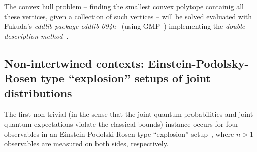 The convex hull problem --  finding the smallest convex polytope containig all these vertices, given a collection of such vertices --
will be solved evaluated with Fukuda's {\em cddlib package cddlib-094h}~\cite{cdd-pck} (using GMP~\cite{gmplib})
implementing the {\em double description method}~\cite{FP96,Avis:1997:GCH:280651.280652,Avis-2002}.


\subsection{Non-intertwined contexts: Einstein-Podolsky-Rosen type ``explosion'' setups of joint distributions}

The first non-trivial (in the sense that the joint quantum probabilities and joint quantum expectations violate the classical bounds) instance
occurs for four observables in an Einstein-Podolski-Rosen type ``explosion'' setup~\cite{epr},
where $n>1$ observables are measured on both sides, respectively.

